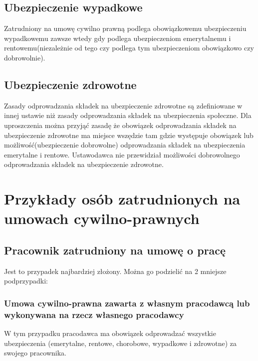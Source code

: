 \subsection[Ubezpieczenie wypadkowe][Ubezpieczenie wypadkowe]{Ubezpieczenie wypadkowe}
Zatrudniony na umowę cywilno prawną podlega obowiązkowemu ubezpieczeniu wypadkowemu zawsze wtedy gdy podlega ubezpieczeniom emerytalnemu i rentowemu(niezależnie od tego czy podlega tym ubezpieczeniom obowiązkowo czy dobrowolnie).

\subsection[Ubezpieczenie zdrowotne][Ubezpieczenie zdrowotne]{Ubezpieczenie zdrowotne}
Zasady odprowadzania składek na ubezpieczenie zdrowotne są zdefiniowane w innej ustawie niż zasady odprowadzania składek na ubezpieczenia społeczne. Dla uproszczenia można przyjąć zasadę że obowiązek odprowadzania składek na ubezpieczenie zdrowotne ma miejsce wszędzie tam gdzie występuje obowiązek lub możliwość(ubezpieczenie dobrowolne) odprowadzania składek na ubezpieczenia emerytalne i rentowe. Ustawodawca nie przewidział możliwości dobrowolnego odprowadzania składek na ubezpieczenie zdrowotne.

\section[Przykłady osób zatrudnionych na umowach cywilno-prawnych][Przykłady osób zatrudnionych na umowach cywilno-prawnych]{Przykłady osób zatrudnionych na umowach cywilno-prawnych}
\label{przykladyOsob}

\subsection[Pracownik zatrudniony na umowę o pracę][Pracownik zatrudniony na umowę o pracę]{Pracownik zatrudniony na umowę o pracę}
\label{umowaOPrace}
Jest to przypadek najbardziej złożony. Można go podzielić na 2 mniejsze podprzypadki:

\subsubsection{Umowa cywilno-prawna zawarta z własnym pracodawcą lub wykonywana na rzecz własnego pracodawcy}
W tym przypadku pracodawca ma obowiązek odprowadzać wszystkie ubezpieczenia (emerytalne, rentowe, chorobowe, wypadkowe i zdrowotne) za swojego pracownika.

